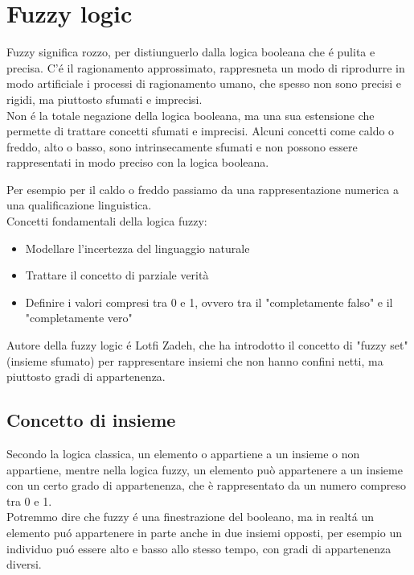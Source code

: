 \section{Fuzzy logic}
Fuzzy significa rozzo, per distiunguerlo dalla logica booleana che é pulita e precisa. 
C'é il ragionamento approssimato, rappresneta un modo di riprodurre in modo artificiale i processi di 
ragionamento umano, che spesso non sono precisi e rigidi, ma piuttosto sfumati e imprecisi.\\

Non é la totale negazione della logica booleana, ma una sua estensione che permette di trattare concetti sfumati e imprecisi.
Alcuni concetti come caldo o freddo, alto o basso, sono intrinsecamente sfumati e non possono essere rappresentati in modo
preciso con la logica booleana.

Per esempio per il caldo o freddo passiamo da una rappresentazione numerica a una qualificazione linguistica.\\

Concetti fondamentali della logica fuzzy:
\begin{itemize}
    \item Modellare l'incertezza del linguaggio naturale
    \item Trattare il concetto di parziale verità
    \item Definire i valori compresi tra 0 e 1, ovvero tra il "completamente falso" e il "completamente vero"
\end{itemize}

Autore della fuzzy logic é Lotfi Zadeh, che ha introdotto il concetto di "fuzzy set" (insieme sfumato)
per rappresentare insiemi che non hanno confini netti, ma piuttosto gradi di appartenenza.\\

\subsection{Concetto di insieme}
Secondo la logica classica, un elemento o appartiene a un insieme o non appartiene, 
mentre nella logica fuzzy, un elemento può appartenere a un insieme con un certo grado di appartenenza, 
che è rappresentato da un numero compreso tra 0 e 1.\\

Potremmo dire che fuzzy é una finestrazione del booleano, ma in realtá un elemento puó appartenere in parte 
anche in due insiemi opposti, per esempio un individuo puó essere alto e basso allo stesso tempo, con gradi di appartenenza diversi.\\

